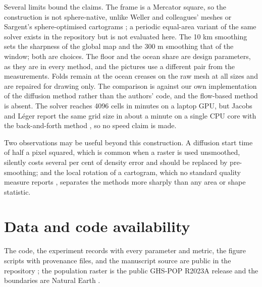 Several limits bound the claims. The frame is a Mercator square, so the
construction is not sphere-native, unlike Weller and colleagues' meshes
or Sargent's sphere-optimised cartograms \citep{weller2016,sargent2024}; a periodic
equal-area variant of the same solver exists in the repository but is
not evaluated here. The 10 km smoothing sets the sharpness of the global
map and the 300 m smoothing that of the window; both are choices. The
floor and the ocean share are design parameters, as they are in every
method, and the pictures use a different pair from the measurements.
Folds remain at the ocean creases on the raw mesh at all sizes and are
repaired for drawing only. The comparison is against our own
implementation of the diffusion method rather than the authors' code,
and the flow-based method is absent. The solver reaches 4096 cells in
minutes on a laptop GPU, but Jacobs and Léger report the same grid size
in about a minute on a single CPU core with the back-and-forth method
\citep{jacobs2020}, so no speed claim is made.

Two observations may be useful beyond this construction. A diffusion
start time of half a pixel squared, which is common when a raster is
used unsmoothed, silently costs several per cent of density error and
should be replaced by pre-smoothing; and the local rotation of a
cartogram, which no standard quality measure reports \citep{nusrat2016,alam2015},
separates the methods more sharply than any area or shape statistic.

\section*{Data and code availability}\label{data-and-code-availability}

The code, the experiment records with every parameter and metric, the
figure scripts with provenance files, and the manuscript source are
public in the repository \citep{repo}; the population raster is the
public GHS-POP R2023A release \citep{ghspop2023} and the boundaries are
Natural Earth \citep{naturalearth}.
